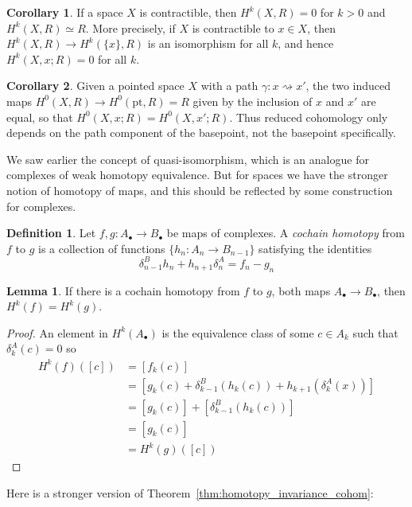 \documentclass{tufte-handout}
\def\pt {\mathrm{pt}}
\theoremstyle{definition}
\newtheorem{lemma}{Lemma}
\newtheorem{definition}{Definition}
\newtheorem{corollary}{Corollary}
\begin{document}
\begin{corollary}
If a space $X$ is contractible, then $H^k(X,R) = 0$ for $k>0$ and $H^k(X,R) \simeq R$. More precisely,
if $X$ is contractible to $x\in X$, then $H^k(X,R) \to H^k(\{x\},R)$ is an isomorphism for all $k$,
and hence $H^k(X,x;R) = 0$ for all $k$.
\end{corollary}

\begin{corollary}
Given a pointed space $X$ with a path $\gamma\colon x\rightsquigarrow x'$, the two induced maps 
$H^0(X,R) \to H^0(\pt,R) = R$ given by the inclusion of $x$ and $x'$ are equal, so that 
$H^0(X,x;R) = H^0(X,x';R)$. Thus reduced cohomology only depends on the path component of the basepoint,
not the basepoint specifically.
\end{corollary}

We saw earlier the concept of quasi-isomorphism, which is an analogue for complexes of weak homotopy
equivalence. But for spaces we have the stronger notion of homotopy of maps, and this should be reflected
by some construction for complexes.

\begin{definition}
Let $f,g\colon A_\bullet \to B_\bullet$ be maps of complexes. A \emph{cochain homotopy} from $f$ 
to $g$ is a collection of functions $\{h_n\colon A_n \to B_{n-1}\}$ satisfying the identities
\[
	\delta^B_{n-1}h_n + h_{n+1}\delta^A_n = f_n - g_n
\]
\end{definition}

\begin{lemma}
If there is a cochain homotopy from $f$ to $g$, both maps $A_\bullet\to B_\bullet$, then $H^k(f) = H^k(g)$.
\end{lemma}

\begin{proof}
An element in $H^k(A_\bullet)$ is the equivalence class of some $c\in A_k$ such that $\delta^A_k(c) = 0$
so
\begin{align*}
H^k(f)([c]) & = [f_k(c)]\\
	& = [g_k(c) + \delta^B_{k-1}(h_k(c)) + h_{k+1}(\delta^A_k(x))]\\
	& = [g_k(c)] + [\delta^B_{k-1}(h_k(c))] \\
	& = [g_k(c)]\\
	& = H^k(g)([c])
\end{align*}
\end{proof}

Here is a stronger version of Theorem~\ref{thm:homotopy_invariance_cohom}:
\end{document}
